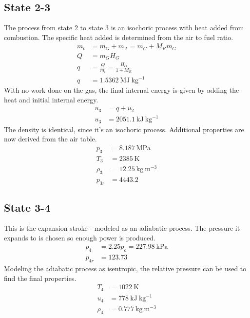\documentclass[10pt,a4paper]{article}
\begin{document}
	\subsection*{State 2-3}
	The process from state 2 to state 3 is an isochoric process with heat added from combustion. The specific heat added is determined from the air to fuel ratio.
	\begin{align}
		m_t &= m_G + m_A = m_G + M_R m_G \\
		Q &= m_G H_G \\
		q &= \frac{Q}{m_t} = \frac{H_G}{1 + M_R}\\
		q &= 1.5362\ \text{MJ}\ \text{kg}^{-1}
	\end{align}
	With no work done on the gas, the final internal energy is given by adding the heat and initial internal energy.
	\begin{align}
		u_3 &= q + u_2\\
		u_3 &= 2051.1\ \text{kJ}\ \text{kg}^{-1}
	\end{align}
	The density is identical, since it's an isochoric process. Additional properties are now derived from the air table.
	\begin{align}
		p_3 &= 8.187\ \text{MPa}\\
		T_3 &= 2385\ \text{K}\\
		\rho_3 &= 12.25\ \text{kg}\ \text{m}^{-3}\\
		p_{3r} &= 4443.2
	\end{align}
	\subsection*{State 3-4}
	This is the expansion stroke - modeled as an adiabatic process. The pressure it expands to is chosen so enough power is produced.
	\begin{align}
		p_4 &= 2.25 p_o = 227.98\ \text{kPa}\\
		p_{4r} &= 123.73
	\end{align}
	Modeling the adiabatic process as isentropic, the relative pressure can be used to find the final properties.
	\begin{align}
		T_4 &= 1022\ \text{K}\\
		u_4 &= 778\ \text{kJ}\ \text{kg}^{-1}\\
		\rho_4 &= 0.777\ \text{kg}\ \text{m}^{-3}
	\end{align}
\end{document}
